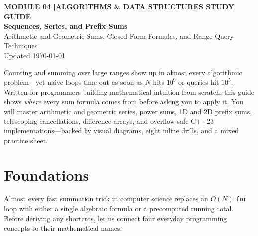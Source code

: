 \documentclass[11pt,a4paper]{article}
\newcommand{\sectionbreak}{}
\theoremstyle{definition}
\begin{document}
\thispagestyle{plain}
\begin{tcolorbox}[
    enhanced,
    colback=primaryblue!6, colframe=primaryblue!20,
    borderline west={5pt}{0pt}{primaryblue},
    arc=4pt, boxrule=0.6pt,
    left=14pt, right=14pt, top=10pt, bottom=10pt,
    before skip=0pt, after skip=8pt
]
    {\footnotesize\bfseries\color{accentteal}MODULE 04 \quad|\quad ALGORITHMS \& DATA STRUCTURES STUDY GUIDE}\\[4pt]
    {\Huge\bfseries\color{primaryblue}Sequences, Series, and Prefix Sums}\\[4pt]
    {\large\color{codegray}Arithmetic and Geometric Sums, Closed-Form Formulas, and Range Query Techniques}\\[5pt]
    {\footnotesize\color{codegray}Updated \today}
\end{tcolorbox}

\begin{overviewbox}
Counting and summing over large ranges show up in almost every algorithmic problem---yet naive loops time out as soon as $N$ hits $10^9$ or queries hit $10^5$. Written for programmers building mathematical intuition from scratch, this guide shows \emph{where} every sum formula comes from before asking you to apply it. You will master arithmetic and geometric series, power sums, 1D and 2D prefix sums, telescoping cancellations, difference arrays, and overflow-safe C++23 implementations---backed by visual diagrams, eight inline drills, and a mixed practice sheet.
\end{overviewbox}

\vspace{1pt}
{\setlength{\parskip}{0pt}\footnotesize\tableofcontents}

\renewcommand{\sectionbreak}{\clearpage}

\section{Foundations}

Almost every fast summation trick in computer science replaces an $O(N)$ \texttt{for} loop with either a single algebraic formula or a precomputed running total. Before deriving any shortcuts, let us connect four everyday programming concepts to their mathematical names.
\end{document}
